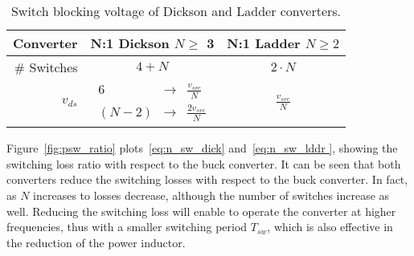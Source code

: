 \begin{table}[h]
\centering
\caption{Switch blocking voltage of Dickson and Ladder converters.}
\label{tab:Dick_Ladder_v_blk}
\renewcommand{\arraystretch}{1.5}%
\begin{tabular}{r | c  c   }
 Converter &  N:1 Dickson  $ N \geq$ 3  &  N:1 Ladder $ N \geq 2$  \\
 \midrule
\# Switches & $ 4 + N $  & $2 \cdot N$ \\
 $v_{ds}$ &     $\begin{array} {rcl} 6   & \to &  \frac{v_{src}}{N} \\
                                     (N - 2) & \to & \frac{2 v_{src}}{N}   
                 \end{array}$
          &  $\frac{v_{src}}{N} $ \\
\end{tabular}
\end{table}

Figure~\ref{fig:psw_ratio} plots~\eqref{eq:n_sw_dick} and~\eqref{eq:n_sw_lddr }, showing the switching loss ratio with respect to the buck converter. It can be seen that both converters reduce the switching losses with respect to the buck converter. In fact, as $N$ increases to losses decrease, although the number of switches increase as well. Reducing the switching loss will enable to operate the converter at higher frequencies, thus with a smaller switching period $T_{sw}$, which is also effective in the reduction of the power inductor. 

\begin{SCfigure}
\centering
{}
\caption{Switching loss ratio for Dickson and Ladder converters with respect to the buck converter.}
\label{fig:psw_ratio}
\end{SCfigure}

